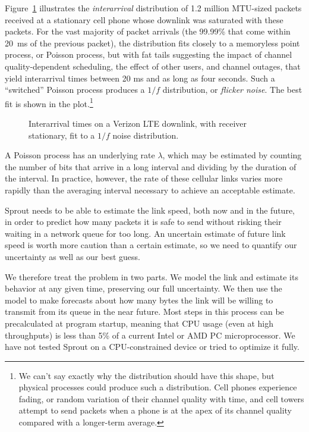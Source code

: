 Figure~\ref{f:vzinter} illustrates the {\em interarrival} distribution
of 1.2 million MTU-sized packets received at a stationary cell phone
whose downlink was saturated with these packets. For the vast majority
of packet arrivals (the 99.99\% that come within 20~ms of the previous
packet), the distribution fits closely to a memoryless point process,
or Poisson process, but with fat tails suggesting the impact of
channel quality-dependent scheduling, the effect of other users, and
channel outages, that yield interarrival times between 20 ms and as
long as four seconds.  Such a ``switched'' Poisson process produces a
$1/f$ distribution, or {\em flicker noise}. The best fit is shown in
the plot.\footnote{We can't say exactly why the distribution should
  have this shape, but physical processes could produce such a
  distribution. Cell phones experience fading, or random variation of
  their channel quality with time, and cell towers attempt to send
  packets when a phone is at the apex of its channel quality compared
  with a longer-term average. }


\begin{figure}
\caption{Interarrival times on a Verizon LTE downlink, with receiver
  stationary, fit to a $1/f$ noise distribution.}

\hspace{\baselineskip}

\def\svgwidth{\columnwidth}

\label{f:vzinter}

\end{figure}

A Poisson process has an underlying rate $\lambda$, which may be
estimated by counting the number of bits that arrive in a long
interval and dividing by the duration of the interval. In practice,
however, the rate of these cellular links varies more rapidly than the
averaging interval necessary to achieve an acceptable estimate.

Sprout needs to be able to estimate the link speed, both now and in
the future, in order to predict how many packets it is safe to send
without risking their waiting in a network queue for too long. An
uncertain estimate of future link speed is worth more caution than a
certain estimate, so we need to quantify our uncertainty as well as
our best guess.

We therefore treat the problem in two parts. We model the link and
estimate its behavior at any given time, preserving our full
uncertainty. We then use the model to make forecasts about how many
bytes the link will be willing to transmit from its queue in the near
future. Most steps in this process can be precalculated at program
startup, meaning that CPU usage (even at high throughputs) is less
than 5\% of a current Intel or AMD PC microprocessor. We have not
tested Sprout on a CPU-constrained device or tried to optimize it
fully.

